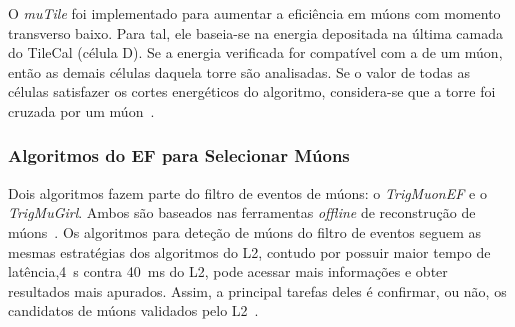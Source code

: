 O \emph{muTile} foi implementado para aumentar a eficiência em múons com momento
transverso baixo. Para tal, ele baseia-se na energia depositada na última camada
do TileCal (célula D). Se a energia verificada for compatível com a de um múon,
então as demais células daquela torre são analisadas. Se o valor de todas as
células satisfazer os cortes energéticos do algoritmo, considera-se que a torre
foi cruzada por um múon~\cite{USAI2004}.

\subsubsection{Algoritmos do EF para Selecionar Múons}

Dois algoritmos fazem parte do filtro de eventos de múons: o \emph{TrigMuonEF} e
o \emph{TrigMuGirl}. Ambos são baseados nas ferramentas \emph{offline} de
reconstrução de múons~\cite{ARMSTRONG2004}.
Os algoritmos para deteção de múons do filtro de eventos seguem as mesmas
estratégias dos algoritmos do L2, contudo por possuir maior tempo de
latência,4~s contra 40~ms do L2, pode acessar mais informações e obter
resultados mais apurados. Assim, a principal tarefas deles é confirmar, ou não,
os candidatos de múons validados pelo L2~\cite{VENTURA2010}.

